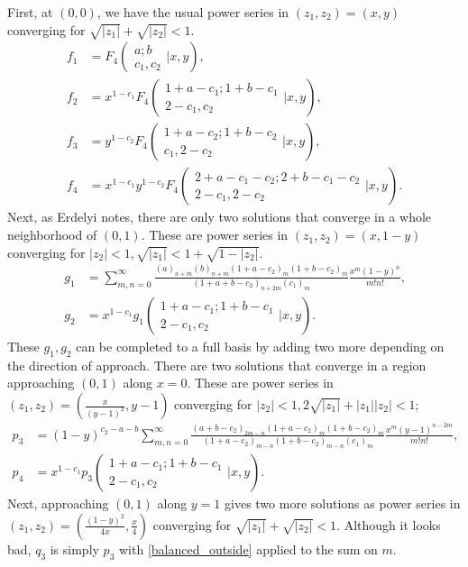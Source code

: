 \documentclass[12pt]{article}
\numberwithin{equation}{section}
\newcommand{\ArgS}[3] {( \begin{smallmatrix} #1 \\ #2 \end{smallmatrix} | {#3})}
\newcommand{\appellFfourS}[6]    {F_4 \ArgS{{#1};{#2}}{{#3},{#4}}{{#5},{#6}}}
\begin{document}
First, at $(0,0)$, we have the usual power series in $(z_1, z_2) = (x, y)$ converging for $\sqrt{|z_1|} + \sqrt{|z_2|} < 1$.
\begin{equation*}
\begin{aligned}
f_1 &= \appellFfourS{a}{b}{c_1}{c_2}{x}{y}\text{,}\\
f_2 &= x^{1-c_1} \appellFfourS{1+a-c_1}{1+b-c_1}{2-c_1}{c_2}{x}{y}\text{,}\\
f_3 &= y^{1-c_2} \appellFfourS{1+a-c_2}{1+b-c_2}{c_1}{2-c_2}{x}{y}\text{,}\\
f_4 &= x^{1-c_1} y^{1-c_2} \appellFfourS{2+a-c_1-c_2}{2+b-c_1-c_2}{2-c_1}{2-c_2}{x}{y}\text{.}
\end{aligned}
\end{equation*}
Next, as Erdelyi notes, there are only two solutions that converge in a whole neighborhood of $(0,1)$. These are power series in
$(z_1,z_2) = (x, 1-y)$ converging for $|z_2| < 1, \sqrt{|z_1|} < 1 + \sqrt{1-|z_2|}$.
\begin{equation*}
\begin{aligned}
g_1 &= \sum_{m,n=0}^{\infty} \tfrac{(a)_{n+m}(b)_{n+m}(1+a-c_2)_{m}(1+b-c_2)_{m}}{(1+a+b-c_2)_{n+2m}(c_1)_{m}} \tfrac{x^m (1-y)^{n}}{m! n!}\text{,}\\
g_2 &= x^{1-c_1} g_1 \ArgS{1+a-c_1;1+b-c_1}{2-c_1,c_2}{x,y} \text{.}
\end{aligned}
\end{equation*}
These $g_1,g_2$ can be completed to a full basis by adding two more depending on the direction of approach.
There are two solutions that converge in a region approaching $(0,1)$ along $x=0$. These are power series in
$(z_1,z_2) = (\frac{x}{(y-1)^2}, y-1)$ converging for $|z_2|<1, 2\sqrt{|z_1|} + |z_1||z_2| < 1$;
\begin{equation*}
\begin{aligned}
p_3 &= (1-y)^{c_2-a-b} \sum_{m,n=0}^{\infty} \tfrac{(a+b-c_2)_{2m-n} (1+a-c_2)_{m} (1+b-c_2)_{m}}{(1+a-c_2)_{m-n} (1+b-c_2)_{m-n} (c_1)_m} \tfrac{x^m (y-1)^{n-2m}}{m! n!}\text{,}\\
p_4 &= x^{1-c_1} p_3 \ArgS{1+a-c_1;1+b-c_1}{2-c_1,c_2}{x,y} \text{.}
\end{aligned}
\end{equation*}
Next, approaching $(0,1)$ along $y=1$ gives two more solutions as power series in $(z_1,z_2) = (\frac{(1-y)^2}{4x}, \frac{x}{4})$ converging for $\sqrt{|z_1|} + \sqrt{|z_2|} < 1$.
Although it looks bad, $q_3$ is simply $p_3$ with \eqref{balanced_outside} applied to the sum on $m$.
\end{document}

